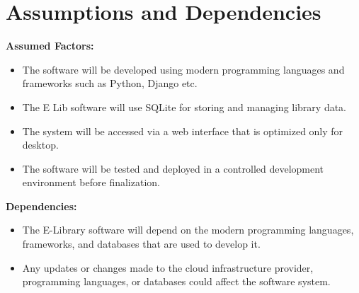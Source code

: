 \section{Assumptions and Dependencies}
\textbf{Assumed Factors:}
\begin{itemize}
    \item The software will be developed using modern programming languages and frameworks such as Python, Django etc.
    \item The E Lib software will use SQLite for storing and managing library data.
    \item The system will be accessed via a web interface that is optimized only for desktop.
    \item The software will be tested and deployed in a controlled development environment before finalization.
    

\end{itemize}
\textbf{Dependencies:}
\begin{itemize}
    \item The E-Library software will depend on the modern programming languages, frameworks, and databases that are used to develop it.
    \item Any updates or changes made to the cloud infrastructure provider, programming languages, or databases could affect the software system.

\end{itemize}